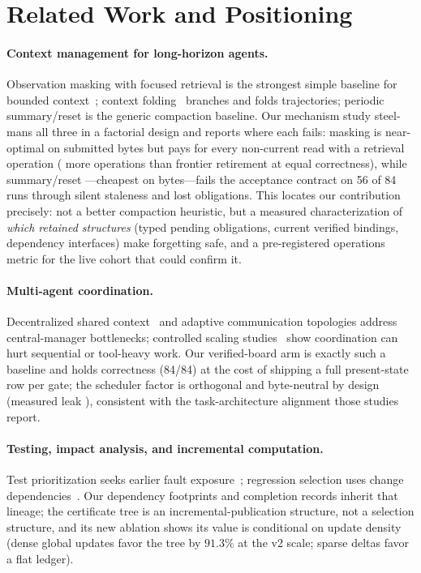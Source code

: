 \section{Related Work and Positioning}\label{sec:related}
\paragraph{Context management for long-horizon agents.}
Observation masking with focused retrieval is the strongest simple
baseline for bounded context~\cite{complexitytrap}; context
folding~\cite{contextfolding} branches and folds trajectories; periodic
summary/reset is the generic compaction baseline. Our mechanism study
steel-mans all three in a factorial design and reports where each
fails: masking is near-optimal on submitted bytes but pays for every
non-current read
with a retrieval operation (\RetwoOpsReduction{} more operations than
frontier retirement at equal correctness), while summary/reset
---cheapest on bytes---fails the acceptance contract on 56 of 84 runs
through silent staleness and lost obligations. This locates our contribution
precisely: not a better compaction heuristic, but a measured
characterization of \emph{which retained structures} (typed pending
obligations, current verified bindings, dependency interfaces) make
forgetting safe, and a pre-registered operations metric for the live
cohort that could confirm it.

\paragraph{Multi-agent coordination.}
Decentralized shared context~\cite{delm} and adaptive communication
topologies address central-manager bottlenecks; controlled
scaling studies~\cite{scale} show coordination can hurt sequential or
tool-heavy work. Our verified-board arm is exactly such a baseline and
holds correctness (84/84) at the cost of shipping a full present-state
row per gate; the scheduler factor is orthogonal and byte-neutral by
design (measured leak \RetwoSEffectOnBytes{}), consistent with the
task-architecture alignment those studies report.

\paragraph{Testing, impact analysis, and incremental computation.}
Test prioritization seeks earlier fault exposure~\cite{rothermel};
regression selection uses change dependencies~\cite{ekstazi,namerts}.
Our dependency footprints and completion records inherit that lineage;
the certificate tree is an incremental-publication structure, not a
selection structure, and its new ablation shows its value is
conditional on update density (dense global updates favor the tree by
$91.3\%$ at the v2 scale; sparse deltas favor a flat ledger).


